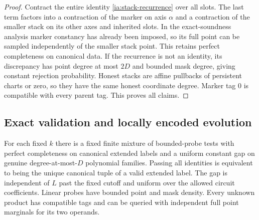 \begin{proof}
Contract the entire identity \eqref{ia:stack-recurrence} over all
slots.  The last term factors into a contraction of the marker on
axis $\alpha$ and a contraction of the smaller stack on its other
axes and inherited slots.  In the exact-soundness analysis marker
constancy has already been imposed, so its full point can be sampled
independently of the smaller stack point.  This retains perfect
completeness on canonical data.  If the recurrence is not an
identity, its discrepancy has point degree at most $2D$ and bounded
mask degree, giving constant rejection probability.  Honest stacks
are affine pullbacks of persistent charts or zero, so they have the
same honest coordinate degree.  Marker tag $0$ is compatible with
every parent tag.  This proves all claims.
\end{proof}

\subsection{Exact validation and locally encoded evolution}
\label{ia:validation-and-evolution}

\begin{lemma}\label{ia:exact-validator}
For each fixed $k$ there is a fixed finite mixture of bounded-probe
tests with perfect completeness on canonical extended labels and a
uniform constant gap on genuine degree-at-most-$D$ polynomial
families.  Passing all identities is equivalent to being the unique
canonical tuple of a valid extended label.  The gap is independent
of $L$ past the fixed cutoff and uniform over the allowed circuit
coefficients.  Linear probes have bounded point and mask density.
Every unknown product has compatible tags and can be queried with
independent full point marginals for its two operands.
\end{lemma}

